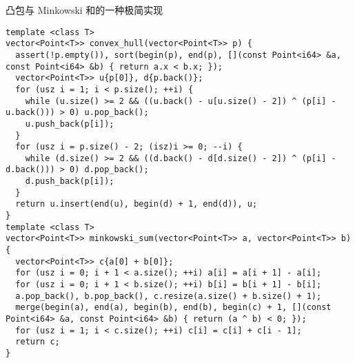 凸包与 Minkowski 和的一种极简实现

\begin{verbatim}
template <class T>
vector<Point<T>> convex_hull(vector<Point<T>> p) {
  assert(!p.empty()), sort(begin(p), end(p), [](const Point<i64> &a, const Point<i64> &b) { return a.x < b.x; });
  vector<Point<T>> u{p[0]}, d{p.back()};
  for (usz i = 1; i < p.size(); ++i) {
    while (u.size() >= 2 && ((u.back() - u[u.size() - 2]) ^ (p[i] - u.back())) > 0) u.pop_back();
    u.push_back(p[i]);
  }
  for (usz i = p.size() - 2; (isz)i >= 0; --i) {
    while (d.size() >= 2 && ((d.back() - d[d.size() - 2]) ^ (p[i] - d.back())) > 0) d.pop_back();
    d.push_back(p[i]);
  }
  return u.insert(end(u), begin(d) + 1, end(d)), u;
}
template <class T>
vector<Point<T>> minkowski_sum(vector<Point<T>> a, vector<Point<T>> b) {
  vector<Point<T>> c{a[0] + b[0]};
  for (usz i = 0; i + 1 < a.size(); ++i) a[i] = a[i + 1] - a[i];
  for (usz i = 0; i + 1 < b.size(); ++i) b[i] = b[i + 1] - b[i];
  a.pop_back(), b.pop_back(), c.resize(a.size() + b.size() + 1);
  merge(begin(a), end(a), begin(b), end(b), begin(c) + 1, [](const Point<i64> &a, const Point<i64> &b) { return (a ^ b) < 0; });
  for (usz i = 1; i < c.size(); ++i) c[i] = c[i] + c[i - 1];
  return c;
}
\end{verbatim}